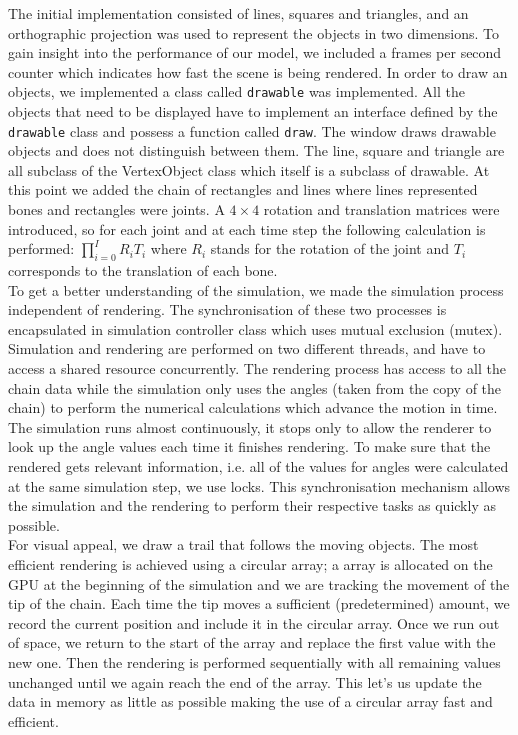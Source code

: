 \documentclass[paper=a4, fontsize=11pt]{scrartcl} %
\numberwithin{equation}{section} %
\numberwithin{figure}{section} %
\numberwithin{table}{section} %
\begin{document}
The initial implementation consisted of lines, squares and triangles, and an orthographic projection was used to represent the objects in two dimensions. To gain insight into the performance of our model, we included a frames per second counter which indicates how fast the scene is being rendered. In order to draw an objects, we implemented a class called \texttt{drawable} was implemented. All the objects that need to be displayed have to implement an interface defined by the \texttt{drawable} class and possess a function called \texttt{draw}. The window draws drawable objects and does not distinguish between them. The line, square and triangle are all subclass of the VertexObject class which itself is a subclass of drawable. At this point we added the chain of rectangles and lines where lines represented bones and rectangles were joints. A \(4 \times 4\) rotation and translation matrices were introduced, so for each joint and at each time step the following calculation is performed:  \(\prod_{i=0}^I R_i T_i\) where \(R_i\) stands for the rotation of the joint and \(T_i\) corresponds to the translation of each bone. \\

To get a better understanding of the simulation, we made the simulation process independent of rendering. The synchronisation of these two processes is encapsulated in simulation controller class which uses mutual exclusion (mutex). Simulation and rendering are performed on two different threads, and have to access a shared resource concurrently. The rendering process has access to all the chain data while the simulation only uses the angles (taken from the copy of the chain) to perform the numerical calculations which advance the motion in time. The simulation runs almost continuously, it stops only to allow the renderer to look up the angle values each time it finishes rendering. To make sure that the rendered gets relevant information, i.e. all of the values for angles were calculated at the same simulation step, we use locks. This synchronisation mechanism allows the simulation and the rendering to perform their respective tasks as quickly as possible. \\

For visual appeal, we draw a trail that follows the moving objects. The most efficient rendering is achieved using a circular array; a array is allocated on the GPU at the beginning of the simulation and we are tracking the movement of the tip of the chain. Each time the tip moves a sufficient (predetermined) amount, we record the current position and include it in the circular array. Once we run out of space, we return to the start of the array and replace the first value with the new one. Then the rendering is performed sequentially with all remaining values unchanged until we again reach the end of the array. This let's us update the data in memory as little as possible making the use of a circular array fast and efficient. \\
\end{document}
